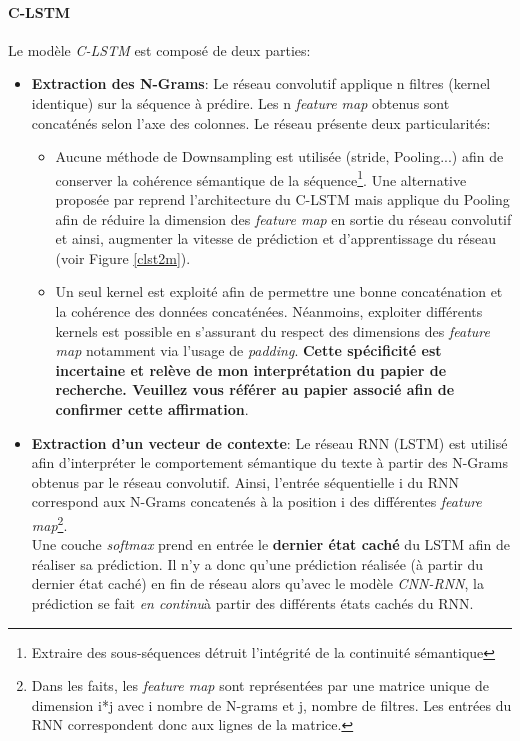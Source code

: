 \paragraph{C-LSTM}
\noindent Le modèle \textit{C-LSTM}\cite{clstm} est composé de deux parties:
\begin{itemize}
    \item \textbf{Extraction des N-Grams}: Le réseau convolutif applique n filtres (kernel identique) sur la séquence à prédire. Les n \textit{feature map} obtenus sont concaténés selon l'axe des colonnes. Le réseau présente deux particularités:
    \begin{itemize}
        \item Aucune méthode de Downsampling est utilisée (stride, Pooling...) afin de conserver la cohérence sémantique de la séquence\footnote{Extraire des sous-séquences détruit l'intégrité de la continuité sémantique}. Une alternative proposée par \cite{clstm2} reprend l'architecture du C-LSTM mais applique du Pooling afin de réduire la dimension des \textit{feature map} en sortie du réseau convolutif et ainsi, augmenter la vitesse de prédiction et d'apprentissage du réseau (voir Figure \ref{clst2m}).

        \item Un seul kernel est exploité afin de permettre une bonne concaténation et la cohérence des données concaténées. Néanmoins, exploiter différents kernels est possible en s'assurant du respect des dimensions des \textit{feature map} notamment via l'usage de \textit{padding}. \textbf{Cette spécificité est incertaine et relève de mon interprétation du papier de recherche. Veuillez vous référer au papier associé afin de confirmer cette affirmation}.
    \end{itemize}

    \item \textbf{Extraction d'un vecteur de contexte}: Le réseau RNN (LSTM) est utilisé afin d'interpréter le comportement sémantique du texte à partir des N-Grams obtenus par le réseau convolutif. Ainsi, l'entrée séquentielle i du RNN correspond aux N-Grams concatenés à la position i des différentes \textit{feature map}\footnote{Dans les faits, les \textit{feature map} sont représentées par une matrice unique de dimension i*j avec i nombre de N-grams et j, nombre de filtres. Les entrées du RNN correspondent donc aux lignes de la matrice.}.\\

    Une couche \textit{softmax} prend en entrée le \textbf{dernier état caché} du LSTM afin de réaliser sa prédiction. Il n'y a donc qu'une prédiction réalisée (à partir du dernier état caché) en fin de réseau alors qu'avec le modèle \textit{CNN-RNN}, la prédiction se fait \textit{en continu}à partir des différents états cachés du RNN.
\end{itemize}


